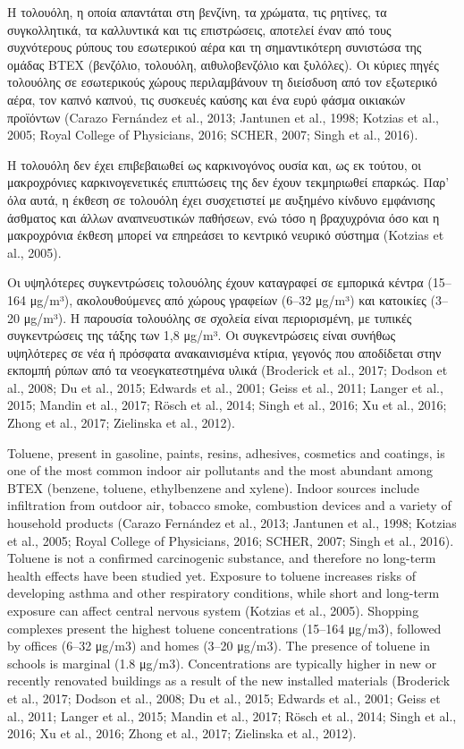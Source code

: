Η τολουόλη, η οποία απαντάται στη βενζίνη, τα χρώματα, τις ρητίνες, τα συγκολλητικά, τα καλλυντικά και τις επιστρώσεις, αποτελεί έναν από τους συχνότερους ρύπους του εσωτερικού αέρα και τη σημαντικότερη συνιστώσα της ομάδας BTEX (βενζόλιο, τολουόλη, αιθυλοβενζόλιο και ξυλόλες). Οι κύριες πηγές τολουόλης σε εσωτερικούς χώρους περιλαμβάνουν τη διείσδυση από τον εξωτερικό αέρα, τον καπνό καπνού, τις συσκευές καύσης και ένα ευρύ φάσμα οικιακών προϊόντων (Carazo Fernández et al., 2013; Jantunen et al., 1998; Kotzias et al., 2005; Royal College of Physicians, 2016; SCHER, 2007; Singh et al., 2016).

Η τολουόλη δεν έχει επιβεβαιωθεί ως καρκινογόνος ουσία και, ως εκ τούτου, οι μακροχρόνιες καρκινογενετικές επιπτώσεις της δεν έχουν τεκμηριωθεί επαρκώς. Παρ’ όλα αυτά, η έκθεση σε τολουόλη έχει συσχετιστεί με αυξημένο κίνδυνο εμφάνισης άσθματος και άλλων αναπνευστικών παθήσεων, ενώ τόσο η βραχυχρόνια όσο και η μακροχρόνια έκθεση μπορεί να επηρεάσει το κεντρικό νευρικό σύστημα (Kotzias et al., 2005).

Οι υψηλότερες συγκεντρώσεις τολουόλης έχουν καταγραφεί σε εμπορικά κέντρα (15–164 μg/m³), ακολουθούμενες από χώρους γραφείων (6–32 μg/m³) και κατοικίες (3–20 μg/m³). Η παρουσία τολουόλης σε σχολεία είναι περιορισμένη, με τυπικές συγκεντρώσεις της τάξης των 1,8 μg/m³. Οι συγκεντρώσεις είναι συνήθως υψηλότερες σε νέα ή πρόσφατα ανακαινισμένα κτίρια, γεγονός που αποδίδεται στην εκπομπή ρύπων από τα νεοεγκατεστημένα υλικά (Broderick et al., 2017; Dodson et al., 2008; Du et al., 2015; Edwards et al., 2001; Geiss et al., 2011; Langer et al., 2015; Mandin et al., 2017; Rösch et al., 2014; Singh et al., 2016; Xu et al., 2016; Zhong et al., 2017; Zielinska et al., 2012).

Toluene, present in gasoline, paints, resins, adhesives, cosmetics and coatings, is one of the most common indoor air pollutants and the most abundant among BTEX (benzene, toluene, ethylbenzene and xylene). Indoor sources include infiltration from outdoor air, tobacco smoke, combustion devices and a variety of household products (Carazo Fernández et al., 2013; Jantunen et al., 1998; Kotzias et al., 2005; Royal College of Physicians, 2016; SCHER, 2007; Singh et al., 2016). Toluene is not a confirmed carcinogenic substance, and therefore no long-term health effects have been studied yet. Exposure to toluene increases risks of developing asthma and other respiratory conditions, while short and long-term exposure can affect central nervous system (Kotzias et al., 2005). Shopping complexes present the highest toluene concentrations (15–164 μg/m3), followed by offices (6–32 μg/m3) and homes (3–20 μg/m3). The presence of toluene in schools is marginal (1.8 μg/m3). Concentrations are typically higher in new or recently renovated buildings as a result of the new installed materials (Broderick et al., 2017; Dodson et al., 2008; Du et al., 2015; Edwards et al., 2001; Geiss et al., 2011; Langer et al., 2015; Mandin et al., 2017; Rösch et al., 2014; Singh et al., 2016; Xu et al., 2016; Zhong et al., 2017; Zielinska et al., 2012).

